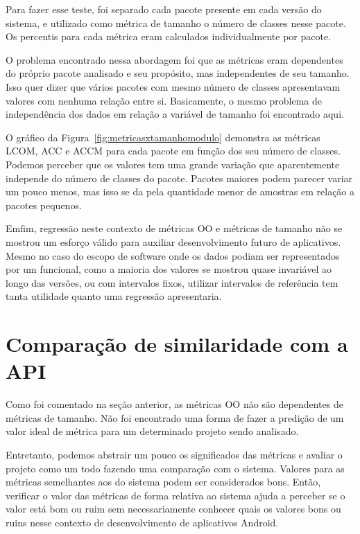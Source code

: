 Para fazer esse teste, foi separado cada pacote presente em cada versão do sistema, e utilizado como métrica de tamanho o número de classes nesse pacote. Os percentis para cada métrica eram calculados individualmente por pacote.

O problema encontrado nessa abordagem foi que as métricas eram dependentes do próprio pacote analisado e seu propósito, mas independentes de seu tamanho. Isso quer dizer que vários pacotes com mesmo número de classes apresentavam valores com nenhuma relação entre si. Basicamente, o mesmo problema de independência dos dados em relação a variável de tamanho foi encontrado aqui.

O gráfico da Figura~\ref{fig:metricasxtamanhomodulo} demonstra as métricas LCOM, ACC e ACCM para cada pacote em função dos seu número de classes. Podemos perceber que os valores tem uma grande variação que aparentemente independe do número de classes do pacote. Pacotes maiores podem parecer variar um pouco menos, mas isso se da pela quantidade menor de amostras em relação a pacotes pequenos.

Emfim, regressão neste contexto de métricas OO e métricas de tamanho não se mostrou um esforço válido para auxiliar desenvolvimento futuro de aplicativos. Mesmo no caso do escopo de software onde os dados podiam ser representados por um funcional, como a maioria dos valores se mostrou quase invariável ao longo das versões, ou com intervalos fixos, utilizar intervalos de referência tem tanta utilidade quanto uma regressão apresentaria. 

\section{Comparação de similaridade com a API}

Como foi comentado na seção anterior, as métricas OO não são dependentes de métricas de tamanho. Não foi encontrado uma forma de fazer a predição de um valor ideal de métrica para um determinado projeto sendo analisado.  

Entretanto, podemos abstrair um pouco os significados das métricas e avaliar o projeto como um todo fazendo uma comparação com o sistema. Valores para as métricas semelhantes aos do sistema podem ser considerados bons. Então, verificar o valor das métricas de forma relativa ao sistema ajuda a perceber se o valor está bom ou ruim sem necessariamente conhecer quais os valores bons ou ruins nesse contexto de desenvolvimento de aplicativos Android. 

